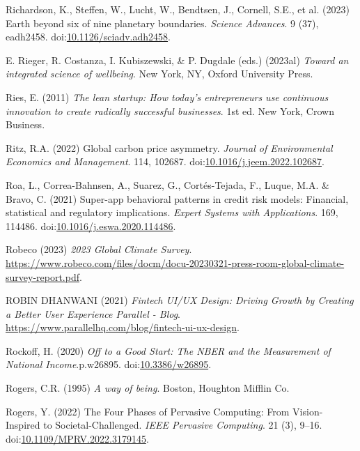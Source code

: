 \documentclass[
  letterpaper,
  DIV=11,
  numbers=noendperiod]{scrartcl}
\newlength{\cslhangindent}
\newenvironment{CSLReferences}[2] %
 {\begin{list}{}{%
  \setlength{\itemindent}{0pt}
  \setlength{\leftmargin}{0pt}
  \setlength{\parsep}{0pt}
  \ifodd #1
   \setlength{\leftmargin}{\cslhangindent}
   \setlength{\itemindent}{-1\cslhangindent}
  \fi
  \setlength{\itemsep}{#2\baselineskip}}}
 {\end{list}}
\begin{document}
\begin{CSLReferences}{0}{1}
Richardson, K., Steffen, W., Lucht, W., Bendtsen, J., Cornell, S.E., et
al. (2023) Earth beyond six of nine planetary boundaries. \emph{Science
Advances}. 9 (37), eadh2458.
doi:\href{https://doi.org/10.1126/sciadv.adh2458}{10.1126/sciadv.adh2458}.

E. Rieger, R. Costanza, I. Kubiszewski, \& P. Dugdale (eds.) (2023al)
\emph{Toward an integrated science of wellbeing}. New York, NY, Oxford
University Press.

Ries, E. (2011) \emph{The lean startup: How today's entrepreneurs use
continuous innovation to create radically successful businesses}. 1st
ed. New York, Crown Business.

Ritz, R.A. (2022) Global carbon price asymmetry. \emph{Journal of
Environmental Economics and Management}. 114, 102687.
doi:\href{https://doi.org/10.1016/j.jeem.2022.102687}{10.1016/j.jeem.2022.102687}.

Roa, L., Correa-Bahnsen, A., Suarez, G., Cortés-Tejada, F., Luque, M.A.
\& Bravo, C. (2021) Super-app behavioral patterns in credit risk models:
{Financial}, statistical and regulatory implications. \emph{Expert
Systems with Applications}. 169, 114486.
doi:\href{https://doi.org/10.1016/j.eswa.2020.114486}{10.1016/j.eswa.2020.114486}.

Robeco (2023) \emph{2023 {Global Climate Survey}}.
\url{https://www.robeco.com/files/docm/docu-20230321-press-room-global-climate-survey-report.pdf}.

ROBIN DHANWANI (2021) \emph{Fintech {UI}/{UX Design}: {Driving Growth}
by {Creating} a {Better User Experience} {\textbar} {Parallel} -
{Blog}}. \url{https://www.parallelhq.com/blog/fintech-ui-ux-design}.

Rockoff, H. (2020) \emph{Off to a {Good Start}: {The NBER} and the
{Measurement} of {National Income}}.p.w26895.
doi:\href{https://doi.org/10.3386/w26895}{10.3386/w26895}.

Rogers, C.R. (1995) \emph{A way of being}. Boston, Houghton Mifflin Co.

Rogers, Y. (2022) The {Four Phases} of {Pervasive Computing}: {From
Vision-Inspired} to {Societal-Challenged}. \emph{IEEE Pervasive
Computing}. 21 (3), 9--16.
doi:\href{https://doi.org/10.1109/MPRV.2022.3179145}{10.1109/MPRV.2022.3179145}.


\end{CSLReferences}
\end{document}
